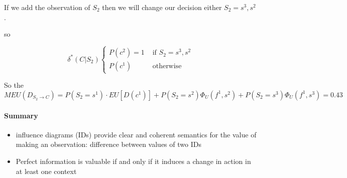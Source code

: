 If we add the observation of $S_2$ then we will change our decision either $S_2 = s^3, s^2$.

so 

 \begin{equation*}
  \delta^*(C|S_2)
      \begin{cases}
       P(c^2) = 1 & \text{ if } S_2 = s^3 , s^2 \\
       P(c^1) & \text{ otherwise }
      \end{cases}
 \end{equation*}
 
 So the 
 \begin{equation*}
  MEU(D_{S_2 \rightarrow C}) =  P(S_2 = s^1) \cdot EU[D(c^1)] + P(S_2 = s^2) \Phi_U(f^1,s^2) + P(S_2 = s^3) \Phi_U(f^1,s^3) = 0.43
 \end{equation*}
 
 
 \paragraph{Summary}
 
 \begin{itemize}
  \item influence diagrams (IDs) provide clear and coherent semantics for the value of making an observation: difference between values of two IDs
   \item Perfect information is valuable if and only if it induces a change in action in at least one context
 \end{itemize}

 
 
 

  
 
 









